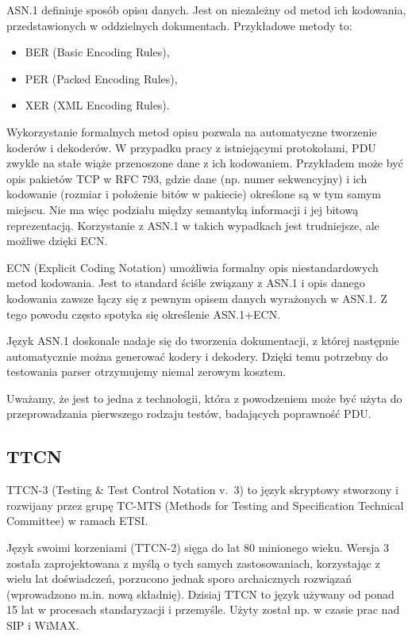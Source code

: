 \documentclass[00-praca-magisterska.tex]{subfiles}
\begin{document}
ASN.1 definiuje sposób opisu danych. Jest on niezależny od metod ich kodowania,
przedstawionych w oddzielnych dokumentach. Przykładowe metody to:
\begin{itemize}
\item BER (Basic Encoding Rules),
\item PER (Packed Encoding Rules),
\item XER (XML Encoding Rules).
\end{itemize}

Wykorzystanie formalnych metod opisu pozwala na automatyczne tworzenie koderów i
dekoderów. W przypadku pracy z istniejącymi protokołami, PDU zwykle na stałe
wiąże przenoszone dane z ich kodowaniem. Przykładem może być opis pakietów TCP w
RFC 793, gdzie dane (np. numer sekwencyjny) i ich kodowanie (rozmiar i
położenie bitów w pakiecie) określone są w tym samym miejscu. Nie ma więc podziału między semantyką informacji i jej bitową reprezentacją. Korzystanie z ASN.1 w takich wypadkach jest
trudniejsze, ale możliwe dzięki ECN.

ECN (Explicit Coding Notation) umożliwia formalny opis niestandardowych metod
kodowania. Jest to standard ściśle związany z ASN.1 i opis danego kodowania
zawsze łączy się z pewnym opisem danych wyrażonych w ASN.1. Z tego powodu często
spotyka się określenie ASN.1+ECN.


Język ASN.1 doskonale nadaje się do tworzenia dokumentacji, z której następnie
automatycznie można generować kodery i dekodery. Dzięki temu potrzebny do
testowania parser otrzymujemy niemal zerowym kosztem.

Uważamy, że jest to jedna z technologii, która z powodzeniem może być użyta do
przeprowadzania pierwszego rodzaju testów, badających poprawność PDU.

\subsection{TTCN}

TTCN-3 (Testing \& Test Control Notation v.~3) to język skryptowy stworzony i
rozwijany przez grupę TC-MTS (Methods for Testing and Specification Technical
Committee) w ramach ETSI.

Język swoimi korzeniami (TTCN-2) sięga do lat 80 minionego wieku. Wersja 3
została zaprojektowana z myślą o tych samych zastosowaniach, korzystając z wielu
lat doświadczeń, porzucono jednak sporo archaicznych rozwiązań (wprowadzono
m.in. nową składnię). Dzisiaj TTCN to język używany od ponad 15 lat w procesach
standaryzacji i przemyśle. Użyty został np. w czasie prac nad SIP i WiMAX.
\end{document}

